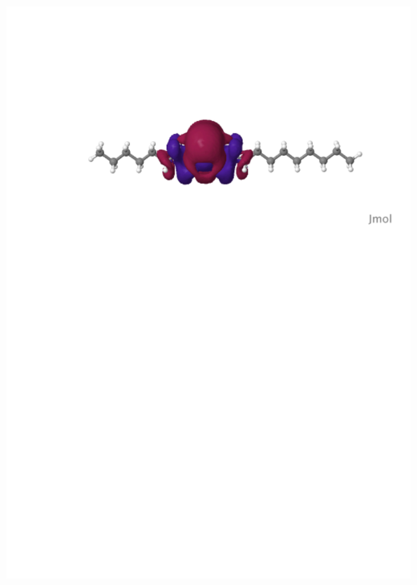 \begin{frame}
\begin{columns}
\begin{column}[b]{0.48\linewidth}
{    \includegraphics[scale=0.25, clip, viewport = 80 560 600 700]{figures/loc_orb_2.pdf}\\
}
\end{column}
\end{columns}
\end{frame}
